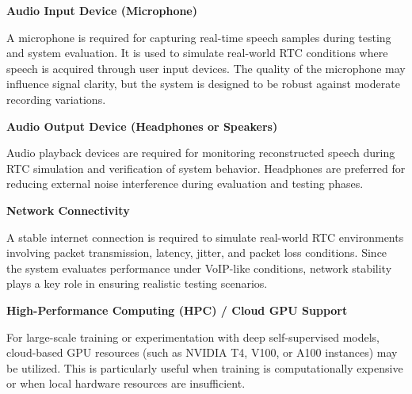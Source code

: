 \textbf{Audio Input Device (Microphone)}

A microphone is required for capturing real-time speech samples during testing and system evaluation. It is used to simulate real-world RTC conditions where speech is acquired through user input devices. The quality of the microphone may influence signal clarity, but the system is designed to be robust against moderate recording variations.

\textbf{Audio Output Device (Headphones or Speakers)}

Audio playback devices are required for monitoring reconstructed speech during RTC simulation and verification of system behavior. Headphones are preferred for reducing external noise interference during evaluation and testing phases.

\textbf{Network Connectivity}

A stable internet connection is required to simulate real-world RTC environments involving packet transmission, latency, jitter, and packet loss conditions. Since the system evaluates performance under VoIP-like conditions, network stability plays a key role in ensuring realistic testing scenarios.

\textbf{High-Performance Computing (HPC) / Cloud GPU Support}

For large-scale training or experimentation with deep self-supervised models, cloud-based GPU resources (such as NVIDIA T4, V100, or A100 instances) may be utilized. This is particularly useful when training is computationally expensive or when local hardware resources are insufficient.